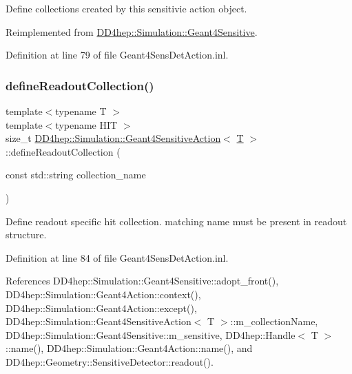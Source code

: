Define collections created by this sensitivie action object. 



Reimplemented from \hyperlink{class_d_d4hep_1_1_simulation_1_1_geant4_sensitive_a88c872b79e49e399c8ee282960c2d77d}{D\+D4hep\+::\+Simulation\+::\+Geant4\+Sensitive}.



Definition at line 79 of file Geant4\+Sens\+Det\+Action.\+inl.

\hypertarget{class_d_d4hep_1_1_simulation_1_1_geant4_sensitive_action_abb78f83f4adb01a7dfa390ae4df33c2d}{}\label{class_d_d4hep_1_1_simulation_1_1_geant4_sensitive_action_abb78f83f4adb01a7dfa390ae4df33c2d} 
\subsubsection{\texorpdfstring{define\+Readout\+Collection()}{defineReadoutCollection()}}
{\footnotesize\ttfamily template$<$typename T $>$ \\
template$<$typename H\+IT $>$ \\
size\+\_\+t \hyperlink{class_d_d4hep_1_1_simulation_1_1_geant4_sensitive_action}{D\+D4hep\+::\+Simulation\+::\+Geant4\+Sensitive\+Action}$<$ \hyperlink{class_t}{T} $>$\+::define\+Readout\+Collection (\begin{DoxyParamCaption}\item[{const std\+::string}]{collection\+\_\+name }\end{DoxyParamCaption})}



Define readout specific hit collection. matching name must be present in readout structure. 



Definition at line 84 of file Geant4\+Sens\+Det\+Action.\+inl.



References D\+D4hep\+::\+Simulation\+::\+Geant4\+Sensitive\+::adopt\+\_\+front(), D\+D4hep\+::\+Simulation\+::\+Geant4\+Action\+::context(), D\+D4hep\+::\+Simulation\+::\+Geant4\+Action\+::except(), D\+D4hep\+::\+Simulation\+::\+Geant4\+Sensitive\+Action$<$ T $>$\+::m\+\_\+collection\+Name, D\+D4hep\+::\+Simulation\+::\+Geant4\+Sensitive\+::m\+\_\+sensitive, D\+D4hep\+::\+Handle$<$ T $>$\+::name(), D\+D4hep\+::\+Simulation\+::\+Geant4\+Action\+::name(), and D\+D4hep\+::\+Geometry\+::\+Sensitive\+Detector\+::readout().

